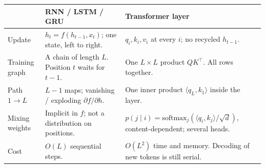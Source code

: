 \documentclass[11pt,a4paper]{article}
\theoremstyle{definition}
\begin{document}
{\small
\setlength{\tabcolsep}{3.6pt}
\renewcommand{\arraystretch}{1.18}
\begin{center}
\begin{tabularx}{\linewidth}{|
  >{\raggedright\arraybackslash}p{2.35cm}|
  >{\raggedright\arraybackslash}X|
  >{\raggedright\arraybackslash}X|
}
\hline
 & \textbf{RNN / LSTM / GRU} & \textbf{Transformer layer} \\
\hline
Update & \(h_t=f(h_{t-1},x_t)\); one state, left to right. & \(q_i,k_i,v_i\) at every \(i\); no recycled \(h_{t-1}\). \\
\hline
Training graph & A chain of length \(L\). Position \(t\) waits for \(t-1\). & One \(L\times L\) product \(QK^\top\). All rows together. \\
\hline
Path \(1\to L\) & \(L-1\) maps; vanishing / exploding \(\partial f/\partial h\). & One inner product \(\langle q_L,k_1\rangle\) inside the layer. \\
\hline
Mixing weights & Implicit in \(f\); not a distribution on positions. & \(p(j\mid i)=\mathrm{softmax}_j(\langle q_i,k_j\rangle/\sqrt{d})\), content-dependent; several heads. \\
\hline
Cost & \(O(L)\) sequential steps. & \(O(L^2)\) time and memory. Decoding of new tokens is still serial. \\
\hline
\end{tabularx}
\end{center}
}
\end{document}
